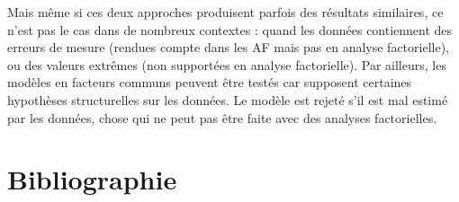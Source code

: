 \documentclass[12pt,a4paper]{reedthesis}
\begin{document}
Mais même si ces deux approches produisent parfois des résultats similaires, ce n'est pas le cas dans de nombreux contextes : quand les données contiennent des erreurs de mesure (rendues compte dans les AF mais pas en analyse factorielle), ou des valeurs extrêmes (non supportées en analyse factorielle). Par ailleurs, les modèles en facteurs communs peuvent être testés car supposent certaines hypothèses structurelles sur les données. Le modèle est rejeté s'il est mal estimé par les données, chose qui ne peut pas être faite avec des analyses factorielles.

\backmatter

\hypertarget{bibliographie}{%
\chapter*{Bibliographie}\label{bibliographie}}


\noindent

\setlength{\parindent}{-0.20in}
\setlength{\leftskip}{0.20in}
\setlength{\parskip}{8pt}


\end{document}
